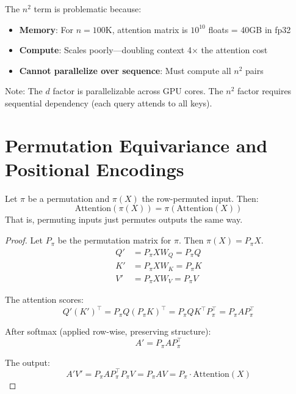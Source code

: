 \begin{remark}
    The $n^2$ term is problematic because:
    \begin{itemize}
        \item \textbf{Memory}: For $n = 100$K, attention matrix is $10^{10}$ floats = 40GB in fp32
        \item \textbf{Compute}: Scales poorly---doubling context 4$\times$ the attention cost
        \item \textbf{Cannot parallelize over sequence}: Must compute all $n^2$ pairs
    \end{itemize}

    Note: The $d$ factor is parallelizable across GPU cores. The $n^2$ factor requires sequential dependency (each query attends to all keys).
\end{remark}

\section{Permutation Equivariance and Positional Encodings}

\begin{theorem}
    Let $\pi$ be a permutation and $\pi(X)$ the row-permuted input. Then:
    \[
        \text{Attention}(\pi(X)) = \pi(\text{Attention}(X))
    \]
    That is, permuting inputs just permutes outputs the same way.
\end{theorem}

\begin{proof}
    Let $P_\pi$ be the permutation matrix for $\pi$. Then $\pi(X) = P_\pi X$.
    \begin{align*}
        Q' &= P_\pi X W_Q = P_\pi Q \\
        K' &= P_\pi X W_K = P_\pi K \\
        V' &= P_\pi X W_V = P_\pi V
    \end{align*}

    The attention scores:
    \[
        Q'(K')^\top = P_\pi Q (P_\pi K)^\top = P_\pi Q K^\top P_\pi^\top = P_\pi A P_\pi^\top
    \]

    After softmax (applied row-wise, preserving structure):
    \[
        A' = P_\pi A P_\pi^\top
    \]

    The output:
    \[
        A' V' = P_\pi A P_\pi^\top P_\pi V = P_\pi A V = P_\pi \cdot \text{Attention}(X)
    \]
\end{proof}

